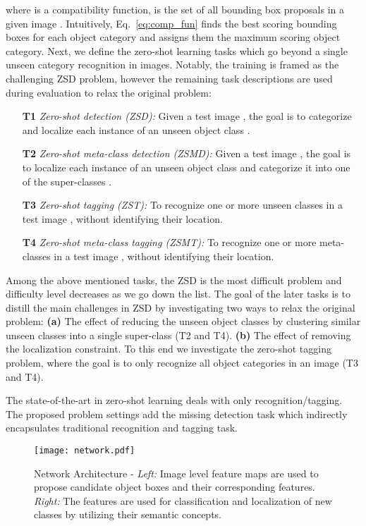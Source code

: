 \documentclass[runningheads]{llncs}
\begin{document}
where  is a compatibility function,  is the set of all bounding box proposals in a given image . Intuitively, Eq.~\ref{eq:comp_fun} finds the best scoring bounding boxes for each object category and assigns them the maximum scoring object category.
Next, we define the zero-shot learning tasks which go beyond a single unseen category recognition in images. Notably, the training is framed as the challenging ZSD problem, however the remaining task descriptions are used during evaluation to relax the original problem: \begin{itemize} \item[\bf T1] \textit{Zero-shot detection (ZSD):} Given a test image , the goal is to categorize and localize each instance of an unseen object class . 
\item[\bf T2] \textit{Zero-shot meta-class detection (ZSMD):} Given a test image , the goal is to localize each instance of an unseen object class  and categorize it into one of the super-classes .
\item[\bf T3] \textit{Zero-shot tagging (ZST):} To recognize one or more unseen classes in a test image ,  without identifying their location.
\item[\bf T4]  \textit{Zero-shot meta-class tagging (ZSMT):} To recognize one or more meta-classes in a test image , without identifying their location.
\end{itemize}

Among the above mentioned tasks, the ZSD is the most difficult problem and difficulty level decreases as we go down the list. The goal of the later tasks is to distill the main challenges in ZSD by investigating two ways to relax the original problem:
\textbf{(a)} The effect of reducing the unseen object classes by clustering similar unseen classes into a single super-class (T2 and T4). 
\textbf{(b)} The effect of removing the localization constraint. To this end we investigate the zero-shot tagging problem, where the goal is to only recognize all object categories in an image (T3 and T4). 

The state-of-the-art in zero-shot learning deals with only recognition/tagging. The proposed problem settings add the missing detection task which indirectly encapsulates traditional recognition and tagging task.


\begin{figure}[t] \centering
   \texttt{[image: network.pdf]}
   \vspace{-1.0em}
   \caption{Network Architecture - \emph{Left:} Image level feature maps are used to propose candidate object boxes and their corresponding features. \emph{Right:} The features are used for classification and localization of new classes by utilizing their semantic concepts.}
\label{fig:network}
\end{figure}
\end{document}
